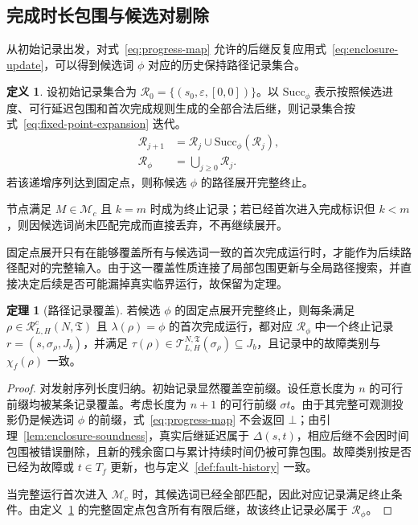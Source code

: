 \documentclass[master,fontset=ubuntu]{shnuthesis}
\theoremstyle{definition}
\newtheorem{thesisdefinition}{定义}
\newtheorem{thesistheorem}{定理}
\begin{document}
\subsection{完成时长包围与候选对剔除}

从初始记录出发，对式~\eqref{eq:progress-map} 允许的后继反复应用式~\eqref{eq:enclosure-update}，可以得到候选词 \(\phi\) 对应的历史保持路径记录集合。

\begin{thesisdefinition}
\label{def:fixed-point-expansion}
设初始记录集合为 \(\mathcal R_0=\{(s_0,\varepsilon,[0,0])\}\)。以 \(\mathrm{Succ}_\phi\) 表示按照候选进度、可行延迟包围和首次完成规则生成的全部合法后继，则记录集合按式~\eqref{eq:fixed-point-expansion} 迭代。
\begin{equation}
\begin{aligned}
\mathcal R_{j+1}
&=
\mathcal R_j
\cup
\mathrm{Succ}_\phi(\mathcal R_j),\\
\mathcal R_\phi
&=
\bigcup_{j\geq0}\mathcal R_j.
\end{aligned}
\label{eq:fixed-point-expansion}
\end{equation}
若该递增序列达到固定点，则称候选 \(\phi\) 的路径展开完整终止。
\end{thesisdefinition}

节点满足 \(M\in\mathcal M_c\) 且 \(k=m\) 时成为终止记录；若已经首次进入完成标识但 \(k<m\)，则因候选词尚未匹配完成而直接丢弃，不再继续展开。

固定点展开只有在能够覆盖所有与候选词一致的首次完成运行时，才能作为后续路径配对的完整输入。由于这一覆盖性质连接了局部包围更新与全局路径搜索，并直接决定后续是否可能漏掉真实临界运行，故保留为定理。

\begin{thesistheorem}[路径记录覆盖]
\label{thm:path-record-coverage}
若候选 \(\phi\) 的固定点展开完整终止，则每条满足 \(\rho\in\mathcal R^c_{L,H}(N,\mathfrak T)\) 且 \(\lambda(\rho)=\phi\) 的首次完成运行，都对应 \(\mathcal R_\phi\) 中一个终止记录 \(r=(s,\sigma_\rho,J_b)\)，并满足 \(\tau(\rho)\in\mathcal T_{L,H}^{N,\mathfrak T}(\sigma_\rho)\subseteq J_b\)，且记录中的故障类别与 \(\chi_f(\rho)\) 一致。
\end{thesistheorem}

\begin{proof}
对发射序列长度归纳。初始记录显然覆盖空前缀。设任意长度为 \(n\) 的可行前缀均被某条记录覆盖。考虑长度为 \(n+1\) 的可行前缀 \(\sigma t\)。由于其完整可观测投影仍是候选词 \(\phi\) 的前缀，式~\eqref{eq:progress-map} 不会返回 \(\bot\)；由引理~\ref{lem:enclosure-soundness}，真实后继延迟属于 \(\Delta(s,t)\)，相应后继不会因时间包围被错误删除，且新的残余窗口与累计持续时间仍被可靠包围。故障类别按是否已经为故障或 \(t\in T_f\) 更新，也与定义~\ref{def:fault-history} 一致。

当完整运行首次进入 \(\mathcal M_c\) 时，其候选词已经全部匹配，因此对应记录满足终止条件。由定义~\ref{def:fixed-point-expansion} 的完整固定点包含所有有限后继，故该终止记录必属于 \(\mathcal R_\phi\)。
\end{proof}
\end{document}
